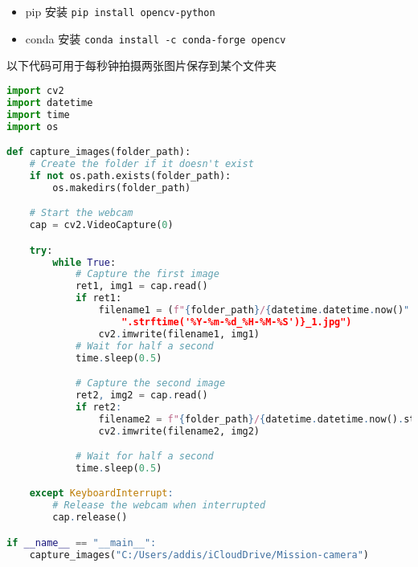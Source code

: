 
\begin{issues}
\issueDraft
\end{issues}

\begin{itemize}
\item pip 安装 \verb`pip install opencv-python`
\item conda 安装 \verb`conda install -c conda-forge opencv`
\end{itemize}

以下代码可用于每秒钟拍摄两张图片保存到某个文件夹
\begin{lstlisting}[language=python,caption=camera.py]
import cv2
import datetime
import time
import os

def capture_images(folder_path):
    # Create the folder if it doesn't exist
    if not os.path.exists(folder_path):
        os.makedirs(folder_path)

    # Start the webcam
    cap = cv2.VideoCapture(0)

    try:
        while True:
            # Capture the first image
            ret1, img1 = cap.read()
            if ret1:
                filename1 = (f"{folder_path}/{datetime.datetime.now()"
                    ".strftime('%Y-%m-%d_%H-%M-%S')}_1.jpg")
                cv2.imwrite(filename1, img1)
            # Wait for half a second
            time.sleep(0.5)

            # Capture the second image
            ret2, img2 = cap.read()
            if ret2:
                filename2 = f"{folder_path}/{datetime.datetime.now().strftime('%Y-%m-%d_%H-%M-%S')}_2.jpg"
                cv2.imwrite(filename2, img2)

            # Wait for half a second
            time.sleep(0.5)

    except KeyboardInterrupt:
        # Release the webcam when interrupted
        cap.release()

if __name__ == "__main__":
    capture_images("C:/Users/addis/iCloudDrive/Mission-camera")
\end{lstlisting}
